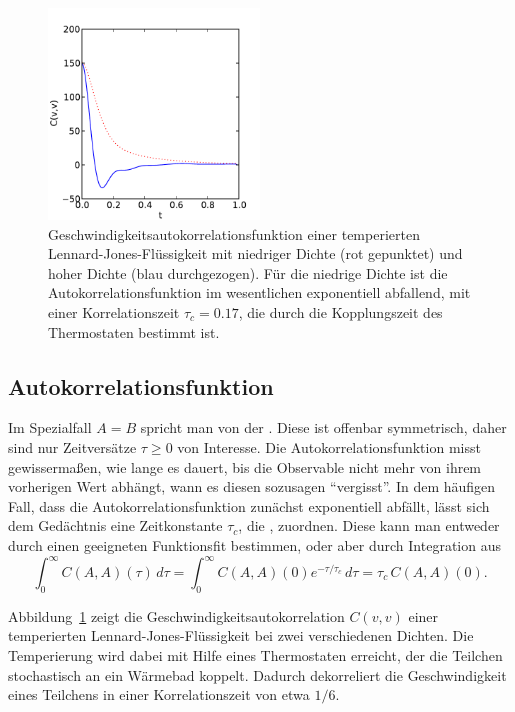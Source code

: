\begin{figure}
  \centering
  \includegraphics[width=0.5\textwidth]{plots/v_ac}
  \caption{Geschwindigkeitsautokorrelationsfunktion einer temperierten
    Lennard-Jones-Flüs\-sig\-ke\-it mit niedriger Dichte (rot
    gepunktet) und hoher Dichte (blau durchgezogen). Für die niedrige
    Dichte ist die Autokorrelationsfunktion im wesentlichen
    exponentiell abfallend, mit einer Korrelationszeit $\tau_c=0.17$,
    die durch die Kopplungszeit des Thermostaten bestimmt ist.}
  \label{fig:vac}
\end{figure}

\subsection{Autokorrelationsfunktion}

Im Spezialfall $A=B$ spricht man von der
\emph{}. Diese ist offenbar
symmetrisch, daher sind nur Zeitversätze $\tau\ge 0$ von
Interesse. Die Autokorrelationsfunktion misst gewissermaßen, wie lange
es dauert, bis die Observable nicht mehr von ihrem vorherigen Wert
abhängt, wann es diesen sozusagen "`vergisst"'. In dem häufigen Fall,
dass die Autokorrelationsfunktion zunächst exponentiell abfällt, lässt
sich dem Gedächtnis eine Zeitkonstante $\tau_c$, die
\emph{}, zuordnen. Diese kann man entweder
durch einen geeigneten Funktionsfit bestimmen, oder aber durch
Integration aus
\begin{equation}
  \label{eq:tauc}
  \int_{0}^{\infty} C(A,A)(\tau)\,d\tau = \int_{0}^{\infty}
  C(A,A)(0)e^{-\tau/\tau_c}\,d\tau = \tau_c\,C(A,A)(0).
\end{equation}

Abbildung~\ref{fig:vac} zeigt die Geschwindigkeitsautokorrelation
$C(v,v)$ einer temperierten Lennard-Jones-Flüs\-sig\-ke\-it bei zwei
verschiedenen Dichten. Die Temperierung wird dabei mit Hilfe eines
Thermostaten erreicht, der die Teilchen stochastisch an ein Wärmebad
koppelt. Dadurch dekorreliert die Geschwindigkeit eines Teilchens in
einer Korrelationszeit von etwa $1/6$.

